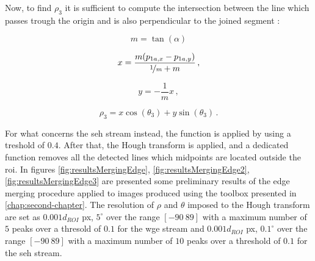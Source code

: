 Now, to find $\rho_3$ it is sufficient to compute the intersection between the line which passes trough the origin and is also perpendicular to the joined segment :

\begin{equation}
  m = \tan(\alpha)
\end{equation}

\begin{equation}
  x = \frac{m(p_{1a,x}-p_{1a,y})}{\nicefrac{1}{m} + m} \,,
\end{equation}

\begin{equation}
  y = - \frac{1}{m} x \,,
\end{equation}

\begin{equation}
  \rho_3 = x \cos (\theta_3) +  y \sin (\theta_3) \,.
\end{equation}

For what concerns the \acrshort{seh} stream instead, the  function is applied by using a treshold of $0.4$. After that, the Hough transform is applied, and a dedicated function removes all the detected lines which midpoints are located outside the \acrshort{roi}.
In figures \ref{fig:resultsMergingEdge}, \ref{fig:resultsMergingEdge2}, \ref{fig:resultsMergingEdge3} are presented some preliminary results of the edge merging procedure applied to images produced using the toolbox presented in \ref{chap:second-chapter}. The resolution of $\rho$ and $\theta$ imposed to the Hough transform are set as $0.001 d_{ROI}$ px, $5^\circ$ over the range $[-90 \ 89]$ with a maximum number of $5$ peaks over a thresold of $0.1$ for the \acrshort{wge} stream and $0.001 d_{ROI}$ px, $0.1^\circ$ over the range $[-90 \ 89]$ with a maximum number of $10$ peaks over a threshold of $0.1$ for the \acrshort{seh} stream.

